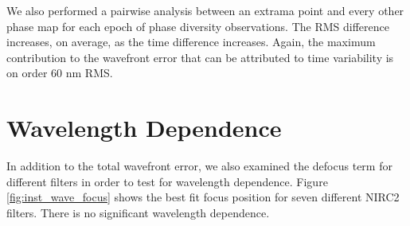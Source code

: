 
We also performed a pairwise analysis between an extrama point and every other phase map for each epoch of phase diversity observations. The RMS difference increases, on average, as the  time difference increases. Again, the maximum contribution to the wavefront error that can be attributed to time variability is on order 60 nm RMS.


\section{Wavelength Dependence}
\label{sec:instrument_chromatic}

In addition to the total wavefront error, we also examined the defocus term for different filters in order to test for wavelength dependence. Figure \ref{fig:inst_wave_focus} shows the best fit focus position for seven different NIRC2 filters. There is no significant 
wavelength dependence. 

